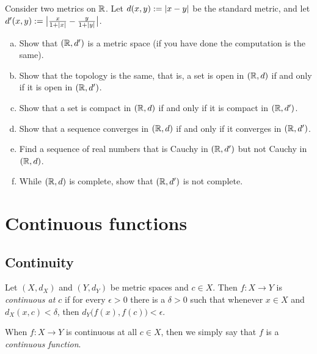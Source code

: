 \begin{samepage}
\begin{exercise} \label{exercise:cauchydepndsonmetric}
Consider two metrics on ${\mathbb{R}}$.
Let $d(x,y) := \left\lvert {x-y} \right\rvert$ be the standard metric,
and let
$d'(x,y) := \bigl\lvert \frac{x}{1+\left\lvert {x} \right\rvert} - \frac{y}{1+\left\lvert {y} \right\rvert}
\bigr\rvert$.
\begin{enumerate}[a)]
\item
Show that $({\mathbb{R}},d')$ is a metric space (if you have done
 the computation is the same).
\item
Show that the topology is the same, that is, a set is open in
$({\mathbb{R}},d)$ if and only if it is open in $({\mathbb{R}},d')$.
\item
Show that a set is compact in
$({\mathbb{R}},d)$ if and only if it is compact in $({\mathbb{R}},d')$.
\item
Show that a sequence converges in $({\mathbb{R}},d)$ if and only if
it converges in $({\mathbb{R}},d')$.
\item
Find a sequence of real numbers that is Cauchy
in $({\mathbb{R}},d')$ but not Cauchy in $({\mathbb{R}},d)$.
\item
While $({\mathbb{R}},d)$ is complete, show that $({\mathbb{R}},d')$ is not complete.
\end{enumerate}
\end{exercise}
\end{samepage}


\sectionnewpage
\section{Continuous functions}
\label{sec:metcont}


\subsection{Continuity}

\begin{defn}
Let $(X,d_X)$ and $(Y,d_Y)$ be metric spaces and $c \in X$.
Then $f \colon X \to Y$ is
\emph{continuous at $c$}
if for every $\epsilon > 0$
there is a $\delta > 0$ such that whenever $x \in X$ and $d_X(x,c) <
\delta$, then
$d_Y\bigl(f(x),f(c)\bigr) < \epsilon$.

\medskip

When $f \colon X \to Y$ is continuous at all $c \in X$, then we simply say
that $f$ is a \emph{continuous function}.
\end{defn}

